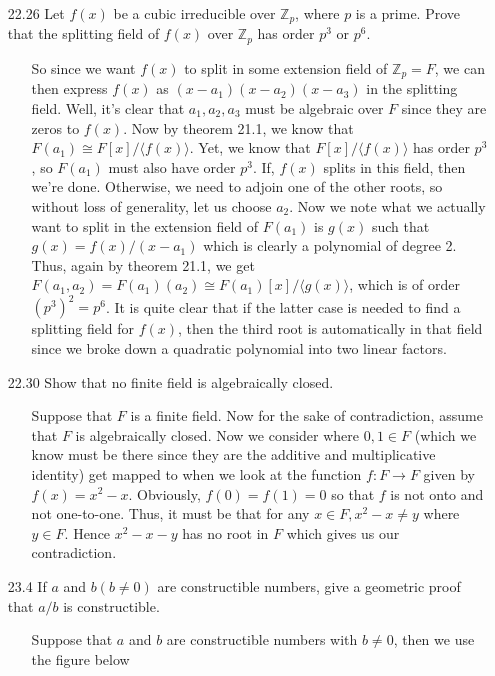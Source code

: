 \documentclass[12pt]{article}
\begin{document}
\begin{enumerate}
\item[22.26] Let $f(x)$ be a cubic irreducible over $\mathbb{Z}_p$, where $p$ is a prime. Prove
that the splitting field of $f(x)$ over $\mathbb{Z}_p$ has order $p^3$ or $p^6$.
\begin{enumerate}
\item[] So since we want $f(x)$ to split in some extension field of $\mathbb{Z}_p = F$, we can then
express $f(x)$ as $(x - a_1)(x - a_2)(x - a_3)$ in the splitting field. Well, it's clear that
$a_1, a_2, a_3$ must be algebraic over $F$ since they are zeros to $f(x)$. Now by
theorem 21.1, we know that $F(a_1) \cong F[x]/\langle f(x)\rangle$. Yet, we know that $F[x]/\langle
f(x)\rangle$ has order $p^3$, so $F(a_1)$ must also have order $p^3$. If, $f(x)$ splits in this field,
then we're done. Otherwise, we need to adjoin one of the other roots, so without loss of generality,
let us choose $a_2$. Now we note what we actually want to split in the extension field of 
$F(a_1)$ is $g(x)$ such that $g(x) = f(x)/(x - a_1)$ which is clearly a polynomial
of degree 2. Thus, again by theorem 21.1, we get $F(a_1, a_2) = F(a_1)(a_2) \cong
F(a_1)[x]/\langle g(x)\rangle$, which is of order $(p^3)^2 = p^6$. It is quite clear that if the
latter case is needed to find a splitting field for $f(x)$, then the third root is automatically 
in that field since we broke down a quadratic polynomial into two linear factors.
\end{enumerate}

\item[22.30] Show that no finite field is algebraically closed.
\begin{enumerate}
\item[] Suppose that $F$ is a finite field. Now for the sake of contradiction, assume
that $F$ is algebraically closed. Now we consider where $0, 1 \in F$ (which we know must be there
since they are the additive and multiplicative identity) get mapped to when we look at the
function $f: F \rightarrow F$ given by $f(x) = x^2 - x$. Obviously, $f(0) = f(1) = 0$ so that
$f$ is not onto and not one-to-one. Thus, it must be that for any $x \in F, x^2 - x \neq y$ where
$y \in F$. Hence $x^2 - x - y$ has no root in $F$ which gives us our contradiction.
\end{enumerate}

\item[23.4] If $a$ and $b (b \neq 0)$ are constructible numbers, give a geometric proof that
$a/b$ is constructible.
\begin{enumerate}
\item[] 
Suppose that $a$ and $b$ are constructible numbers with $b \neq 0$, then we use the
figure below


\end{enumerate}
\end{enumerate}
\end{document}
